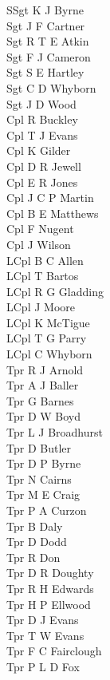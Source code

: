 \begin{multicols}{4}
  \scriptsize
  \noindent
  SSgt K J Byrne \\
  Sgt J F Cartner \\
  Sgt R T E Atkin \\
  Sgt F J Cameron \\
  Sgt S E Hartley \\
  Sgt C D Whyborn \\
  Sgt J D Wood \\
  Cpl R Buckley \\
  Cpl T J Evans \\
  Cpl K Gilder \\
  Cpl D R Jewell \\
  Cpl E R Jones \\
  Cpl J C P Martin \\
  Cpl B E Matthews \\
  Cpl F Nugent \\
  Cpl J Wilson \\
  LCpl B C Allen \\
  LCpl T Bartos \\
  LCpl R G Gladding \\
  LCpl J Moore \\
  LCpl K McTigue \\
  LCpl T G Parry \\
  LCpl C Whyborn \\
  Tpr R J Arnold \\
  Tpr A J Baller \\
  Tpr G Barnes \\
  Tpr D W Boyd \\
  Tpr L J Broadhurst \\
  Tpr D Butler \\
  Tpr D P Byrne \\
  Tpr N Cairns \\
  Tpr M E Craig \\
  Tpr P A Curzon \\
  Tpr B Daly \\
  Tpr D Dodd \\
  Tpr R Don \\
  Tpr D R Doughty \\
  Tpr R H Edwards \\
  Tpr H P Ellwood \\
  Tpr D J Evans \\
  Tpr T W Evans \\
  Tpr F C Fairclough \\
  Tpr P L D Fox \\

\end{multicols}
